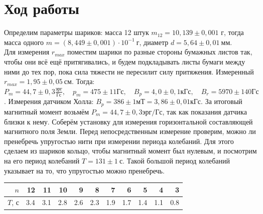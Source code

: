 \section*{Ход работы}
Определим параметры шариков: масса 12 штук $m_{12} = 10,139 \pm 0,001\text{ г}$, тогда масса одного $m = (8,449 \pm 0,001) \cdot 10^{-1}~\text{г}$, диаметр $d = 5,64 \pm 0,01~\text{мм}$.\\
Для измерения $r_{max}$ поместим шарики по разные стороны бумажных листов так, чтобы они всё ещё притягивались, и будем подкладывать листы бумаги между ними до тех пор, пока сила тяжести не пересилит силу притяжения. Измеренный $r_{max} = 1,95 \pm 0,05~\text{см}$. Тогда: 
\n\n
$P_m = 44,7 \pm 0,3 \frac{\text{эрг}}{\text{Гс}}, \quad p_m = 475 \pm 11 \text{Гс}, \quad B_p = 4,0 \pm 0,1 \text{кГс}, \quad B_r = 5970 \pm 140 \text{Гс}$.
\n\n
Измерения датчиком Холла: $B_p = 386 \pm 1\text{мТ}=3,86 \pm 0,01\text{кГс}.$
За итоговый магнитный момент возьмём $P_m = 44,7 \pm 0,3\text{эрг/Гс}$, так как показания датчика близки к нему.
Соберём установку для измерения горизонтальной составляющей магнитного поля Земли. Перед непосредственным измерение проверим, можно ли пренебречь упругостью нити при измерении периода колебаний. Для этого сделаем из шариков кольцо, чтобы магнитный момент был нулевым, и посмотрим на его период колебаний $T = 131 \pm 1~\text{с}$. Такой большой период колебаний указывает на то, что упругостью можно пренебречь.
\begin{table}[h]
\centering
\begin{tabular}{|r|r|r|r|r|r|r|r|r|r|r|}
\hline
$n$ & 12    & 11    & 10    & 9     & 8     & 7     & 6     & 5     & 4     & 3    \\ \hline
$T$, с & 3.4 & 3.1 & 2.8 & 2.6 & 2.3 & 1.9 & 1.7 & 1.4 & 1.1 & 0.8 \\ \hline
\end{tabular}
\end{table}
